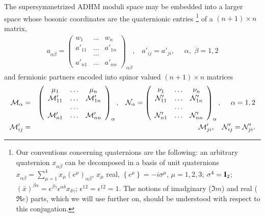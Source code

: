 \documentclass[a4paper,12pt]{article}
\begin{document}
The supersymmetrized ADHM moduli space may be embedded into a 
larger space whose bosonic coordinates are the quaternionic 
entries \footnote{Our conventions concerning quaternions are the following: 
an arbitrary quaternion $x_{\alpha \dot{\beta}}$ can be 
decomposed in a basis of unit quaternions $x_{\alpha \dot{\beta}}= 
\sum_{\mu =1}^4 x_{\mu}\left(e^{\mu}\right)_{\alpha \dot{\beta}}$, 
$x_{\mu}$ real, $\left\{e^{\mu}\right\}=-i \sigma^{\mu}$, $\mu =
1,2,3$; $\sigma^4={\bf I}_2$; $\left(\bar{x}\right)^{\dot{\beta}\alpha}
=\epsilon^{\dot{\beta}\dot{\gamma}}\epsilon^{\alpha \delta}x_{\delta 
\dot{\gamma}}$; $\epsilon^{12}=\epsilon^{\dot{1}\dot{2}}=1$. 
The notions of imadginary ($\Im m$) and real ($\Re e$) parts, which 
we will use further on, should be understood with respect to this 
conjugation.} of a $(n+1)\times n$ matrix, 
\begin{eqnarray}
a_{\alpha \dot{\beta}}=\left( \begin{array}{ccc}
w_1 & \ldots & w_n \\
a'_{11} & \ldots & a'_{1n} \\
 & \ldots &  \\
a'_{n1} & \ldots & a'_{nn}
\end{array}\right)_{\alpha \dot{\beta}} , \, \, \, \, \, a'_{ij}=a'_{ji}, 
\, \, \, \, \, \, \, \, \alpha , \,\, \dot{\beta}=1,2
\label{amatrix}
\end{eqnarray}
and fermionic partners encoded into spinor valued $(n+1)\times n$ 
matrices 
\begin{eqnarray}
{\cal M}_{\alpha} &=& \left( \begin{array}{ccc}
\mu_1 & \ldots & \mu_n \\
{\cal M}'_{11} & \ldots & {\cal M}'_{1n} \\
 & \ldots &  \\
{\cal M}'_{n1} & \ldots & {\cal M}'_{nn}
\end{array}\right)_{\alpha}, \, \, \, \, \, 
{\cal N}_{\alpha}=\left( \begin{array}{ccc}
\nu_1 & \ldots & \nu_n \\
{\cal N}'_{11} & \ldots & {\cal N}'_{1n} \\
 & \ldots &  \\
{\cal N}'_{n1} & \ldots & {\cal N}'_{nn}
\end{array}\right)_{\alpha}, \, \, \, \, \, \, \, \, \alpha=1,2 \nonumber \\
{\cal M}'_{ij} &=& {\cal M}'_{ji}, \, \, \, \, \, \,  
{\cal N}'_{ij} = {\cal N}'_{ji}.
\label{mnmatrix}
\end{eqnarray}
\end{document}
